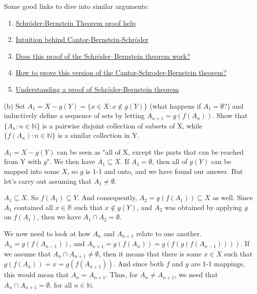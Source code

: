 Some good links to dive into similar arguments:
\begin{enumerate}
    \item \href{https://math.stackexchange.com/questions/3982170/schr%C3%B6der-bernstein-theorem-proof-help}{Schröder-Bernstein Theorem proof help}
    \item \href{https://math.stackexchange.com/questions/225576/intuition-behind-cantor-bernstein-schr%C3%B6der}{Intuition behind Cantor-Bernstein-Schröder}
    \item \href{https://math.stackexchange.com/questions/3296321/does-this-proof-of-the-schr%C3%B6der-bernstein-theorem-work}{Does this proof of the Schröder–Bernstein theorem work?}
    \item \href{https://math.stackexchange.com/questions/925203/how-to-prove-this-version-of-the-cantor-schroder-bernstein-theorem}{How to prove this version of the Cantor-Schroder-Bernstein theorem?}
    \item \href{https://math.stackexchange.com/questions/1726578/understanding-a-proof-of-schr%C3%B6der-bernstein-theorem}{Understanding a proof of Schröder-Bernstein theorem}
\end{enumerate}


(b) Set $A_1 = X - g(Y) = \{x \in X: x \notin g(Y)\}$ (what happens if $A_1 = \emptyset$?)
and inductively define a sequence of sets by letting $A_{n+1} = g(f(A_n))$.
Show that $\{A_n: n \in \mathbb{N} \}$ is a pairwise disjoint collection of subsets of X,
while $\{ f(A_n): n \in \mathbb{N} \}$ is a similar collection in Y.

$A_1 = X - g(Y)$ can be seen as "all of X, except the parts that can be reached from Y with $g$".
We then have $A_1 \subseteq X$.
If $A_1 = \emptyset$, then all of $g(Y)$ can be mapped into some $X$, so $g$ is 1-1 and onto,
and we have found our answer.
But let's carry out assuming that $A_1 \neq \emptyset$.

$A_1 \subseteq X$.
So $f(A_1) \subseteq Y$.
And consequently, $A_2 = g(f(A_1)) \subseteq X$ as well.
Since $A_1$ contained all $x \in \mathbb{R}$ such that $x \notin g(Y)$,
and $A_2$ was obtained by applying $g$ on $f(A_1)$, then we have $A_1 \cap A_2 = \emptyset$.

We now need to look at how $A_n$ and $A_{n+1}$ relate to one another.
$A_n = g(f(A_{n-1}))$, and $A_{n+1} = g(f(A_n)) = g(f(g(f(A_{n-1}))))$.
If we assume that $A_n \cap A_{n+1} \neq \emptyset$, then it means that there is
some $x\in X$ such that $g(f(A_n)) = x = g(f(A_{n+1}))$.
And since both $f$ and $g$ are 1-1 mappings, this would mean that $A_n = A_{n+1}$.
Thus, for $A_n \neq A_{n+1}$, we need that $A_n \cap A_{n+1} = \emptyset$, for all $n\in\mathbb{N}$.
\\



